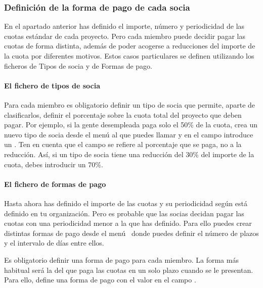\bigskip

\subsubsection{Definición de la forma de pago de cada socia}
En el apartado anterior has definido el importe, número y periodicidad
de las cuotas estándar de cada proyecto. Pero cada miembro puede
decidir pagar las cuotas de forma distinta, además de poder acogerse
a reducciones del importe de la cuota por diferentes motivos. Estos
casos particulares se definen utilizando los ficheros de Tipos de socia
y de Formas de pago.

\paragraph{El fichero de tipos de socia}
Para cada miembro es obligatorio definir un tipo de socia que permite,
aparte de clasificarlos, definir el porcentaje sobre la cuota total del
proyecto que deben pagar. Por ejemplo, si la gente desempleada paga
solo el 50\% de la cuota, crea un nuevo tipo de socia desde el menú
al
que puedes llamar  y en el
campo  introduce un
. Ten en cuenta que el campo
 se refiere al porcentaje que se paga, no
a la reducción. Así, si un tipo de socia tiene una reducción del
30\% del importe de la cuota, debes introducir un 70\%.

\paragraph{El fichero de formas de pago}
Hasta ahora has definido el importe de las cuotas y su periodicidad
según está definido en tu organización. Pero es probable que las
socias decidan pagar las cuotas con una periodicidad menor a la que has
definido. Para ello puedes crear distintas formas de pago desde el
menú \ donde puedes definir el número de plazos y el intervalo de
días entre ellos.

Es obligatorio definir una forma de pago para cada miembro. La forma
más habitual será la del que paga las cuotas en un solo plazo
cuando se le presentan. Para ello, define una forma de pago con el
valor  en el campo .

